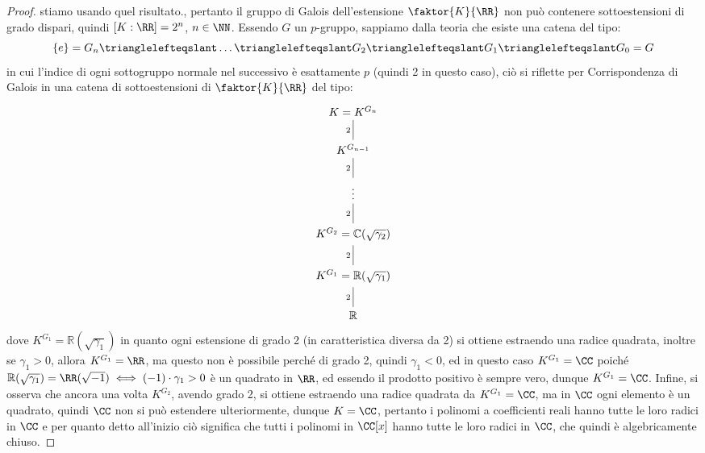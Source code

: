 \documentclass[11pt]{scrartcl}
\begin{document}
\begin{proof}
{    stiamo usando quel risultato.}, pertanto il gruppo di Galois dell'estensione $\faktor{K}{\RR}$ non può contenere sottoestensioni di grado dispari, quindi $[K : \RR] = 2^n$, $n \in \NN$. Essendo $G$ un $p$-gruppo, sappiamo dalla teoria che esiste una catena del tipo:
    \[ \{e\} = G_n \trianglelefteqslant \ldots \trianglelefteqslant G_2 \trianglelefteqslant G_1 \trianglelefteqslant G_0 = G
        \]
    in cui l'indice di ogni sottogruppo normale nel successivo è esattamente $p$ (quindi 2 in questo caso), ciò si riflette per Corrispondenza di Galois in una catena di sottoestensioni di $\faktor{K}{\RR}$ del tipo:
    \[\begin{tikzcd}
        {K = K^{G_n}} \\
        {K^{G_{n-1}}} \\
        \vdots \\
        {K^{G_2} = \mathbb{C}(\sqrt{\gamma_2})} \\
        {K^{G_1} = \mathbb{R}(\sqrt{\gamma_1})} \\
        {\mathbb{R}}
        \arrow["2"', no head, from=1-1, to=2-1]
        \arrow["2"', no head, from=2-1, to=3-1]
        \arrow["2"', no head, from=3-1, to=4-1]
        \arrow["2"', no head, from=5-1, to=6-1]
        \arrow["2"', no head, from=4-1, to=5-1]
    \end{tikzcd}\]
    dove $K^{G_1} = \mathbb{R}(\sqrt{\gamma_1})$ in quanto ogni estensione di grado 2 (in caratteristica diversa da 2) si ottiene estraendo una radice quadrata, inoltre se $\gamma_1 > 0$, allora $K^{G_1} = \RR$, ma questo non è possibile perché di grado 2, quindi $\gamma_1 < 0$, ed in questo caso $K^{G_1} = \CC$ 
    poiché $\mathbb{R}(\sqrt{\gamma_1}) = \RR(\sqrt{-1}) \iff (-1)\cdot \gamma_1 > 0 $ è un quadrato in $\RR$, ed essendo il prodotto positivo è sempre vero, dunque $K^{G_1} = \CC$. Infine, si osserva che ancora una volta $K^{G_2}$, avendo grado 2, si ottiene estraendo una radice quadrata da $K^{G_1} = \CC$, ma in $\CC$ ogni 
    elemento è un quadrato, quindi $\CC$ non si può estendere ulteriormente, dunque $K = \CC$, pertanto i polinomi a coefficienti reali hanno tutte le loro radici in $\CC$ e per quanto detto all'inizio ciò significa che tutti i polinomi in $\CC[x]$ hanno tutte le loro radici in $\CC$, che quindi è algebricamente chiuso.
\end{proof}
\end{document}
